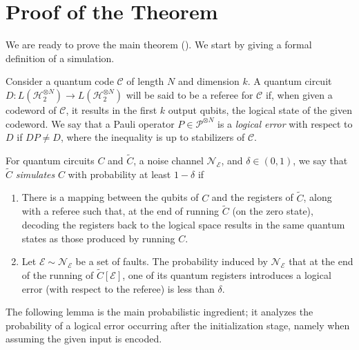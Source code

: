 







\section{Proof of the Theorem}

We are ready to prove the main theorem (). We start by giving a formal definition of a simulation.

  \begin{definition}
    \label{def:simu}
    Consider a quantum code $\mathcal{C}$ of length $N$ and dimension $k$. A quantum circuit $D \colon L(\mathcal{H}_{2}^{\otimes N}) \rightarrow L(\mathcal{H}_{2}^{\otimes N})$ will be said to be a referee for $\mathcal{C}$ if, when given a codeword of $\mathcal{C}$, it results in the first $k$ output qubits, the logical state of the given codeword. We say that a Pauli operator $P \in \mathcal{P}^{\otimes N}$ is a \textit{logical error} with respect to $D$ if $DP \neq D$, where the inequality is up to stabilizers of $\mathcal{C}$.

    For quantum circuits $C$ and $\tilde{C}$, a noise channel $\mathcal{N}_{\mathcal{E}}$, and $\delta \in (0,1)$, we say that $\tilde{C}$ \textit{simulates} $C$ with probability at least $1 - \delta$ if
    \begin{enumerate}
      \item
        There is a mapping between the qubits of $C$ and the registers of $\tilde{C}$, along with a referee such that, at the end of running $\tilde{C}$ (on the zero state), decoding the registers back to the logical space results in the same quantum states as those produced by running $C$.
      \item Let $\mathcal{E} \sim \mathcal{N}_{\mathcal{E}}$ be a set of faults. The probability induced by $\mathcal{N}_{\mathcal{E}}$ that at the end of the running of $\tilde{C}[\mathcal{E}]$, one of its quantum registers introduces a logical error (with respect to the referee) is less than $\delta$.
    \end{enumerate}
  \end{definition}



The following lemma is the main probabilistic ingredient; it analyzes the probability of a logical error occurring after the initialization stage, namely when assuming the given input is encoded.


